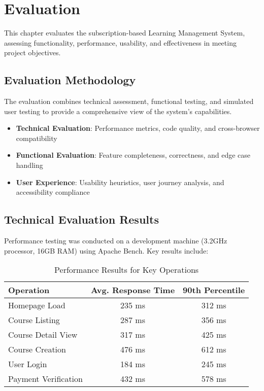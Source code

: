 \section{Evaluation}

This chapter evaluates the subscription-based Learning Management System, assessing functionality, performance, usability, and effectiveness in meeting project objectives.

\subsection{Evaluation Methodology}

The evaluation combines technical assessment, functional testing, and simulated user testing to provide a comprehensive view of the system's capabilities.

\begin{itemize}
    \item \textbf{Technical Evaluation}: Performance metrics, code quality, and cross-browser compatibility
    \item \textbf{Functional Evaluation}: Feature completeness, correctness, and edge case handling
    \item \textbf{User Experience}: Usability heuristics, user journey analysis, and accessibility compliance
\end{itemize}

\subsection{Technical Evaluation Results}

Performance testing was conducted on a development machine (3.2GHz processor, 16GB RAM) using Apache Bench. Key results include:

\begin{table}[h]
\centering
\begin{tabular}{|l|c|c|}
\hline
\textbf{Operation} & \textbf{Avg. Response Time} & \textbf{90th Percentile} \\
\hline
Homepage Load & 235 ms & 312 ms \\
Course Listing & 287 ms & 356 ms \\
Course Detail View & 317 ms & 425 ms \\
Course Creation & 476 ms & 612 ms \\
User Login & 184 ms & 245 ms \\
Payment Verification & 432 ms & 578 ms \\
\hline
\end{tabular}
\caption{Performance Results for Key Operations}
\label{tab:performance}
\end{table}

